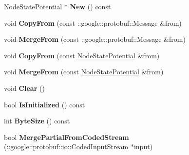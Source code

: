 \begin{DoxyCompactItemize}
\item 
\hypertarget{classgraph_1_1NodeStatePotential_af5fd80aeb33df9a2d08e6fe6b2f6b0e5}{
\hyperlink{classgraph_1_1NodeStatePotential}{NodeStatePotential} $\ast$ {\bfseries New} () const }
\label{classgraph_1_1NodeStatePotential_af5fd80aeb33df9a2d08e6fe6b2f6b0e5}

\item 
\hypertarget{classgraph_1_1NodeStatePotential_ad843be9e9b83a35fa176832eb1bd5b85}{
void {\bfseries CopyFrom} (const ::google::protobuf::Message \&from)}
\label{classgraph_1_1NodeStatePotential_ad843be9e9b83a35fa176832eb1bd5b85}

\item 
\hypertarget{classgraph_1_1NodeStatePotential_a866262febdb1454339ec4c5df39a7638}{
void {\bfseries MergeFrom} (const ::google::protobuf::Message \&from)}
\label{classgraph_1_1NodeStatePotential_a866262febdb1454339ec4c5df39a7638}

\item 
\hypertarget{classgraph_1_1NodeStatePotential_ad9279ae8785df8040b597313593a8693}{
void {\bfseries CopyFrom} (const \hyperlink{classgraph_1_1NodeStatePotential}{NodeStatePotential} \&from)}
\label{classgraph_1_1NodeStatePotential_ad9279ae8785df8040b597313593a8693}

\item 
\hypertarget{classgraph_1_1NodeStatePotential_afed738d7eb798cfa66f0cd24ef51c19f}{
void {\bfseries MergeFrom} (const \hyperlink{classgraph_1_1NodeStatePotential}{NodeStatePotential} \&from)}
\label{classgraph_1_1NodeStatePotential_afed738d7eb798cfa66f0cd24ef51c19f}

\item 
\hypertarget{classgraph_1_1NodeStatePotential_a9f8b12b2fcf2faa5339aa1717a5fb285}{
void {\bfseries Clear} ()}
\label{classgraph_1_1NodeStatePotential_a9f8b12b2fcf2faa5339aa1717a5fb285}

\item 
\hypertarget{classgraph_1_1NodeStatePotential_a22b76e57f65c4389c74ffc73e25beff7}{
bool {\bfseries IsInitialized} () const }
\label{classgraph_1_1NodeStatePotential_a22b76e57f65c4389c74ffc73e25beff7}

\item 
\hypertarget{classgraph_1_1NodeStatePotential_a8a183bdcd7b8a4a0de3d52db9c25c4e9}{
int {\bfseries ByteSize} () const }
\label{classgraph_1_1NodeStatePotential_a8a183bdcd7b8a4a0de3d52db9c25c4e9}

\item 
\hypertarget{classgraph_1_1NodeStatePotential_a23e04477a52de0474588352745d87332}{
bool {\bfseries MergePartialFromCodedStream} (::google::protobuf::io::CodedInputStream $\ast$input)}
\label{classgraph_1_1NodeStatePotential_a23e04477a52de0474588352745d87332}


\end{DoxyCompactItemize}
